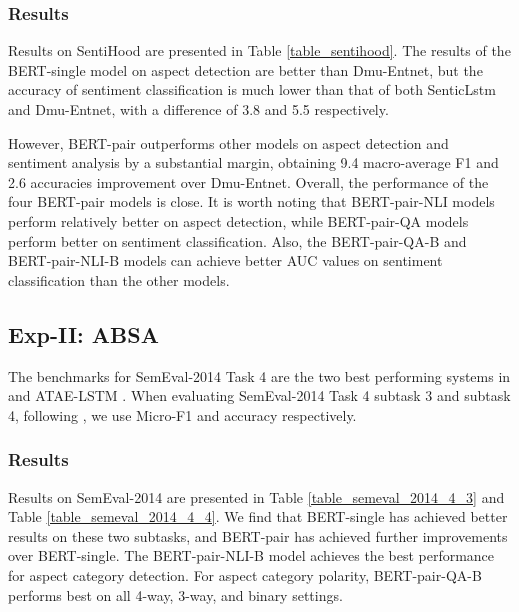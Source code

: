 \documentclass[11pt,a4paper]{article}
\theoremstyle{definition}
\begin{document}
	\subsubsection{Results}
	Results on SentiHood are presented in Table \ref{table_sentihood}. The results of the BERT-single model on aspect detection are better than Dmu-Entnet, but the accuracy of sentiment classification is much lower than that of both SenticLstm and Dmu-Entnet, with a difference of 3.8 and 5.5 respectively.
	
	However, BERT-pair outperforms other models on aspect detection and sentiment analysis by a substantial margin, obtaining 9.4 macro-average F1 and 2.6 accuracies improvement over Dmu-Entnet. Overall, the performance of the four BERT-pair models is close. It is worth noting that BERT-pair-NLI models perform relatively better on aspect detection, while BERT-pair-QA models perform better on sentiment classification. Also, the BERT-pair-QA-B and BERT-pair-NLI-B models can achieve better AUC values on sentiment classification than the other models.
	


	\subsection{Exp-II: ABSA}

	The benchmarks for SemEval-2014 Task 4 are the two best performing systems in \citet{S14-2004} and ATAE-LSTM \cite{wang2016attention}. When evaluating SemEval-2014 Task 4 subtask 3 and subtask 4, following \citet{S14-2004}, we use Micro-F1 and accuracy respectively.
	\subsubsection{Results}
	Results on SemEval-2014 are presented in Table \ref{table_semeval_2014_4_3} and Table \ref{table_semeval_2014_4_4}. We find that BERT-single has achieved better results on these two subtasks, and BERT-pair has achieved further improvements over BERT-single. The BERT-pair-NLI-B model achieves the best performance for aspect category detection. For aspect category polarity, BERT-pair-QA-B performs best on all 4-way, 3-way, and binary settings.
	
\end{document}
